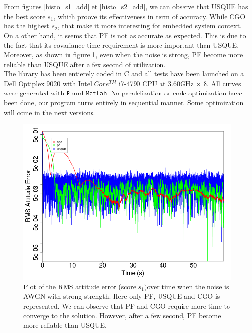 From figures \ref{histo_s1_add} et \ref{histo_s2_add}, we can observe that USQUE has the best score $s_1$, which proove its effectiveness in term of accuracy. While CGO has the highest $s_2$, that make it more interesting for embedded system context. On a other hand, it seems that PF is not as accurate as expected. This is due to the fact that its covariance time requirement is more important than USQUE. Moreover, as shown in figure \ref{error_plot}, even when the noise is strong, PF become more reliable than USQUE after a fex second of utilization. \\

The library has been entierely coded in C and all tests have been launched on a Dell Optiplex 9020 with Intel $ Core^{TM}$ i7-4790 CPU at 3.60GHz $\times$ 8.  All curves were generated with \texttt{R} and \texttt{Matlab}. No paralelization or code optimization have been done, our program turns entirely in sequential manner. Some optimization will come in the next versions.



\begin{figure}
\centering
\includegraphics[scale=0.3]{images/error_plot.png}
\caption{Plot of the RMS attitude error (score $s_1$)over time when the noise is AWGN with strong strength. Here only PF, USQUE and CGO is represented. We can observe that PF and CGO require more time to converge to the solution. However, after a few second, PF become more reliable than USQUE. }
\label{error_plot}
\end{figure}





